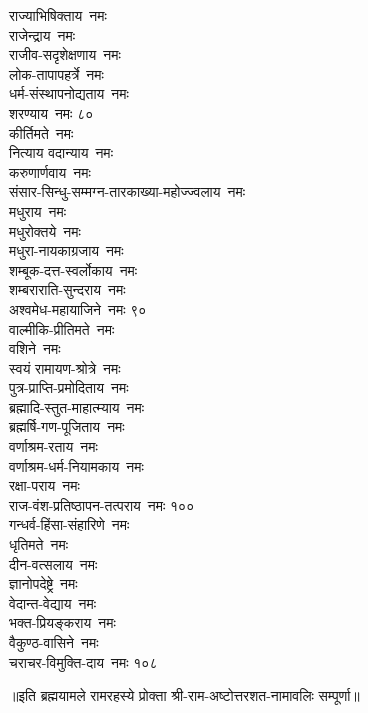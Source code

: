 \begin{multicols}{2}
\begin{flushleft}
राज्याभिषिक्ताय~नमः\\
राजेन्द्राय~नमः\\
राजीव-सदृशेक्षणाय~नमः\\
लोक-तापापहर्त्रे~नमः\\
धर्म-संस्थापनोद्यताय~नमः\\
शरण्याय~नमः \hfill ८०\\
कीर्तिमते~नमः \\
नित्याय वदान्याय~नमः\\
करुणार्णवाय~नमः\\
संसार-सिन्धु-सम्मग्न-तारकाख्या-महोज्ज्वलाय~नमः\\
मधुराय~नमः\\
मधुरोक्तये~नमः\\
मधुरा-नायकाग्रजाय~नमः\\
शम्बूक-दत्त-स्वर्लोकाय~नमः\\
शम्बराराति-सुन्दराय~नमः \\
अश्वमेध-महायाजिने~नमः  \hfill ९०\\
वाल्मीकि-प्रीतिमते~नमः\\
वशिने~नमः\\
स्वयं रामायण-श्रोत्रे~नमः\\
पुत्र-प्राप्ति-प्रमोदिताय~नमः \\
ब्रह्मादि-स्तुत-माहात्म्याय~नमः \\
ब्रह्मर्षि-गण-पूजिताय~नमः\\
वर्णाश्रम-रताय~नमः \\
वर्णाश्रम-धर्म-नियामकाय~नमः\\
रक्षा-पराय~नमः\\
राज-वंश-प्रतिष्ठापन-तत्पराय~नमः \hfill १००\\
गन्धर्व-हिंसा-संहारिणे~नमः\\
धृतिमते~नमः \\
दीन-वत्सलाय~नमः\\
ज्ञानोपदेष्ट्रे~नमः  \\
वेदान्त-वेद्याय~नमः \\
भक्त-प्रियङ्कराय~नमः\\
वैकुण्ठ-वासिने~नमः\\
चराचर-विमुक्ति-दाय~नमः \hfill १०८
\end{flushleft}
\end{multicols}
॥इति ब्रह्मयामले रामरहस्ये प्रोक्ता श्री-राम-अष्टोत्तरशत-नामावलिः सम्पूर्णा॥

